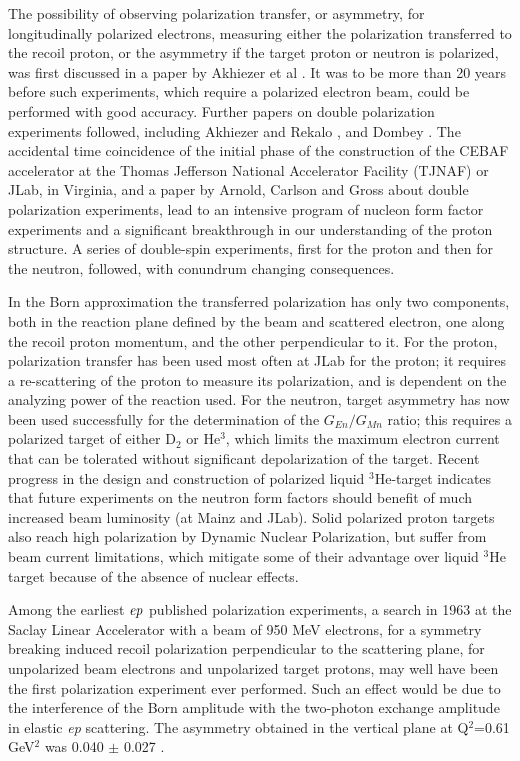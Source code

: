 The possibility of observing polarization transfer, or asymmetry, for longitudinally polarized electrons, measuring either 
the polarization transferred to the recoil proton, or the asymmetry if the target proton or neutron is polarized, was
first discussed in a paper by Akhiezer et al \cite{akh1A,akh1B}. It was to be more than 20 years before such experiments, which 
require a polarized electron beam, could be performed with good accuracy. 
Further papers on double polarization experiments followed, including Akhiezer and Rekalo  \cite{akh2A,akh2B}, and Dombey \cite{dombey}.
The accidental time coincidence of the initial phase of the construction of the CEBAF accelerator at the Thomas Jefferson National
 Accelerator Facility (TJNAF) or JLab, in Virginia,
 and a paper by Arnold, Carlson and Gross \cite{arnold} about double polarization experiments, lead to an intensive program of
 nucleon form factor experiments and a significant breakthrough in our understanding of the proton structure. A series of
 double-spin experiments, first for the proton and then for the neutron, followed, with conundrum changing consequences. 

In the Born  approximation the transferred polarization has only two components, both in the 
reaction plane defined by the beam and scattered electron, one along the recoil proton momentum, and the other perpendicular to it.
For the proton, polarization transfer has been used most often at JLab for the proton; it requires a re-scattering of the proton to
 measure its polarization, 
and is dependent on the analyzing power of the reaction used. For the neutron, target asymmetry has now been used successfully
\cite{riordan:2010} for the determination of the $G_{En}/G_{Mn}$ ratio; this requires a polarized target of either D$_2$ or He$^3$, 
which limits the maximum electron current that can be
 tolerated without significant depolarization of the target. Recent progress in the design and construction of polarized liquid
 $^3$He-target \cite{dolph:2011} indicates that future experiments on the neutron form factors should benefit of much increased beam luminosity
 (at Mainz and JLab). Solid polarized proton targets also reach high polarization by Dynamic Nuclear Polarization, but suffer
 from beam current limitations, which mitigate some of their advantage over liquid $^3$He target  because of the absence of
 nuclear effects.  

Among the earliest ${\it ep}$ published polarization experiments, a search in 1963 at the Saclay Linear Accelerator with a beam 
of 950 MeV electrons, for a symmetry 
breaking induced recoil polarization perpendicular to the scattering plane, for unpolarized beam electrons and unpolarized target protons, 
may well have been the first polarization experiment ever performed. Such an effect would be due to the interference of the Born
 amplitude with the two-photon exchange amplitude in elastic {\it {ep}} scattering. The asymmetry obtained in the vertical plane
at Q$^2$=0.61 GeV$^2$ was 0.040 $\pm$ 0.027 \cite{bizot}.

